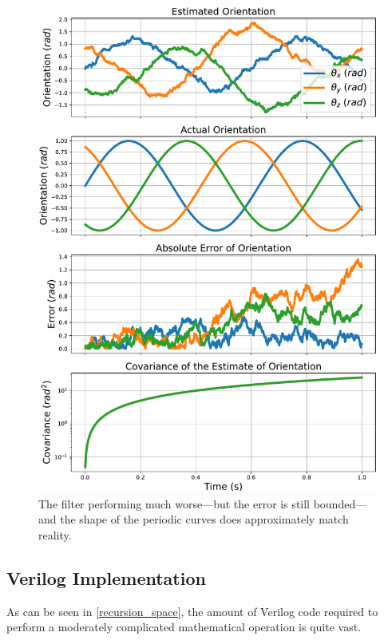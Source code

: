 \documentclass[12pt]{article}
\begin{document}
\begin{figure}[thp]
	\centering
	
	\includegraphics[height=0.8\textheight]{3d-orientation-noisy.pdf}
	
	\caption{The filter performing much worse---but the error is still bounded---and the shape of the periodic curves does approximately match reality.}
	\label{3d_noise_fig}
\end{figure}

\subsection{Verilog Implementation}

As can be seen in \ref{recursion_space}, the amount of Verilog code required to perform a moderately complicated mathematical operation is quite vast.
\end{document}
